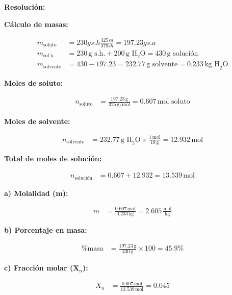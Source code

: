 \documentclass{article}
\begin{document}

\noindent\textbf{Resolución:} %

\textbf{Cálculo de masas:}

\begin{align*}
    m_{\text{soluto}} &= 230g s.h \frac{325sa}{379sh}=197.23g  s.a\\
    m_{\text{sol'n}} &= 230 \, \text{g s.h.} + 200 \, \text{g H}_2\text{O} = 430 \, \text{g solución} \\[10pt]
    m_{\text{solvente}} &= 430 - 197.23 = 232.77 \, \text{g solvente} = 0.233 \, \text{kg H}_2\text{O}
\end{align*}

\textbf{Moles de soluto:}

\begin{align*}
    n_{\text{soluto}} &= \frac{197.23 \, \text{g}}{325 \, \text{g/mol}} = 0.607 \, \text{mol soluto}
\end{align*}

\textbf{Moles de solvente:}

\begin{align*}
    n_{\text{solvente}} &= 232.77 \, \text{g H}_2\text{O} \times \frac{1 \, \text{mol}}{18 \, \text{g}} = 12.932 \, \text{mol}
\end{align*}

\textbf{Total de moles de solución:}

\begin{align*}
    n_{\text{solución}} &= 0.607 + 12.932 = 13.539 \, \text{mol}
\end{align*}

\textbf{a) Molalidad (m):}

\begin{align*}
    m &= \frac{0.607 \, \text{mol}}{0.233 \, \text{kg}} = 2.605 \, \frac{\text{mol}}{\text{kg}}
\end{align*}

\textbf{b) Porcentaje en masa:}

\begin{align*}
    \% \text{masa} &= \frac{197.23 \, \text{g}}{430 \, \text{g}} \times 100 = 45.9\%
\end{align*}

\textbf{c) Fracción molar (X$_n$):}

\begin{align*}
    X_n &= \frac{0.607 \, \text{mol}}{13.539 \, \text{mol}} = 0.045
\end{align*}
\end{document}
